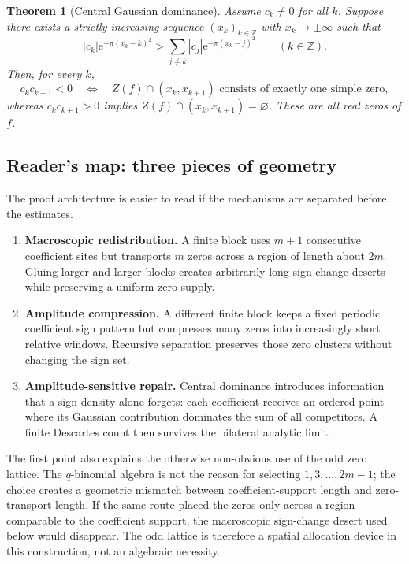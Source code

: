 \documentclass[11pt]{article}
\newtheorem{theorem}{Theorem}[section]
\newcommand{\Z}{\mathbb{Z}}
\newcommand{\e}{\mathrm{e}}
\begin{document}
\begin{theorem}[Central Gaussian dominance]\label{thm:dominance}
Assume $c_k\neq0$ for all $k$. Suppose there exists a strictly increasing sequence $(x_k)_{k\in\Z}$ with $x_k\to\pm\infty$ such that
\begin{equation}\label{eq:dominance}
 |c_k|\e^{-\pi(x_k-k)^2}
 >\sum_{j\neq k}|c_j|\e^{-\pi(x_k-j)^2}\qquad(k\in\Z).
\end{equation}
Then, for every $k$,
\[
 c_kc_{k+1}<0
 \quad\Longleftrightarrow\quad
 Z(f)\cap(x_k,x_{k+1})\text{ consists of exactly one simple zero},
\]
whereas $c_kc_{k+1}>0$ implies $Z(f)\cap(x_k,x_{k+1})=\varnothing$. These are all real zeros of $f$.
\end{theorem}

\subsection*{Reader's map: three pieces of geometry}
The proof architecture is easier to read if the mechanisms are separated before the estimates.
\begin{enumerate}[leftmargin=2.1em]
  \item \textbf{Macroscopic redistribution.} A finite block uses $m+1$ consecutive coefficient sites but transports $m$ zeros across a region of length about $2m$. Gluing larger and larger blocks creates arbitrarily long sign-change deserts while preserving a uniform zero supply.
  \item \textbf{Amplitude compression.} A different finite block keeps a fixed periodic coefficient sign pattern but compresses many zeros into increasingly short relative windows. Recursive separation preserves those zero clusters without changing the sign set.
  \item \textbf{Amplitude-sensitive repair.} Central dominance introduces information that a sign-density alone forgets: each coefficient receives an ordered point where its Gaussian contribution dominates the sum of all competitors. A finite Descartes count then survives the bilateral analytic limit.
\end{enumerate}

The first point also explains the otherwise non-obvious use of the odd zero lattice. The $q$-binomial algebra is not the reason for selecting $1,3,\ldots,2m-1$; the choice creates a geometric mismatch between coefficient-support length and zero-transport length. If the same route placed the zeros only across a region comparable to the coefficient support, the macroscopic sign-change desert used below would disappear. The odd lattice is therefore a spatial allocation device in this construction, not an algebraic necessity.
\end{document}
